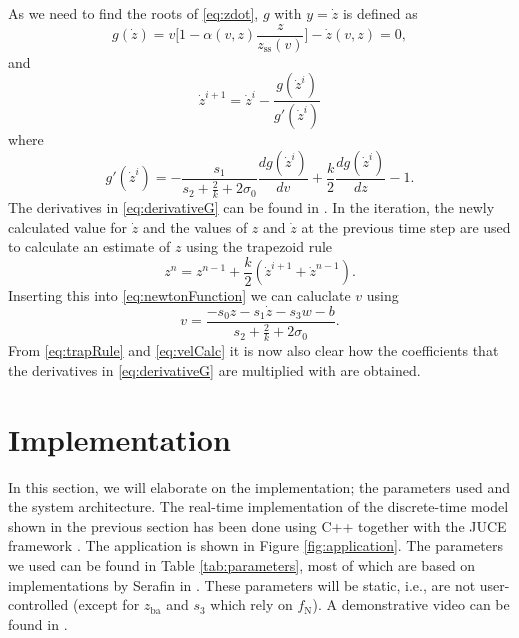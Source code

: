 \documentclass[twoside,a4paper,dvipsnames]{article}
\begin{document}
As we need to find the roots of \eqref{eq:zdot}, $g$ with $y=\dot z$ is defined as
\begin{equation}
   g(\dot z) = v\bigg[1-\alpha(v, z)\frac{z}{z_\text{ss}(v)}\bigg] -  \dot z(v,z) = 0,
\end{equation}
and
\begin{equation}
    \dot z^{i+1} = \dot z^i - \frac{g(\dot z^i)}{g'(\dot z^i)}
\end{equation}
where
\begin{equation}\label{eq:derivativeG}
    g'(\dot z^i) = -\frac{s_1}{s_2+\frac{2}{k} + 2\sigma_0}\frac{dg(\dot z^i)}{dv} + \frac{k}{2}\frac{dg(\dot z^i)}{dz} - 1.
\end{equation}
The derivatives in \eqref{eq:derivativeG} can be found in \cite{Serafin2004}. In the iteration, the newly calculated value for $\dot z$ and the values of $z$ and $\dot z$ at the previous time step are used to calculate an estimate of $z$ using the trapezoid rule
\begin{equation}\label{eq:trapRule}
    z^n = z^{n-1} + \frac{k}{2}(\dot z^{i+1} + \dot z^{n-1}).
\end{equation}
Inserting this into \eqref{eq:newtonFunction} we can caluclate $v$ using
\begin{equation}\label{eq:velCalc}
    v = \frac{-s_0z-s_1\dot z-s_3w-b}{s_2 + \frac{2}{k} + 2\sigma_0}.
\end{equation}
From \eqref{eq:trapRule} and \eqref{eq:velCalc} it is now also clear how the coefficients that the derivatives in \eqref{eq:derivativeG} are multiplied with are obtained. 

\section{Implementation}\label{sec:implementation}
In this section, we will elaborate on the implementation; the parameters used and the system architecture. The real-time implementation of the discrete-time model shown in the previous section has been done using C++ together with the JUCE framework \cite{JUCE}. The application is shown in Figure \ref{fig:application}. The parameters we used can be found in Table \ref{tab:parameters}, most of which are based on implementations by Serafin in \cite{Serafin2004}. These parameters will be static, i.e., are not user-controlled (except for $z_\text{ba}$ and $s_3$ which rely on $f_\text{N}$). A demonstrative video can be found in \cite{video}.
    
\end{document}
